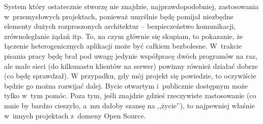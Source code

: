 System który ostatecznie stworzę nie znajdzie, najprawdopodobniej, zastosowania w~przemysłowych projektach, ponieważ umyślnie będę pomijał niezbędne elementy dużych rozproszonych architektur -- bezpieczeństwo komunikacji, zrównoleglanie żądań itp. To, na czym głównie się skupiam, to pokazanie, że łączenie heterogenicznych aplikacji może być całkiem bezbolesne. W~trakcie pisania pracy będę brał pod uwagę jedynie współpracę dwóch programów na raz, ale małe sieci (do kilkunastu klientów na serwer) powinny również działać dobrze (co będę sprawdzał). W przypadku, gdy mój projekt się powiedzie, to oczywiście będzie go można rozwijać dalej. Bycie otwartym i~publicznie dostępnym może tylko w~tym pomóc. Poza tym, jeśli znajdzie gdzieś rzeczywiste zastosowanie (co mnie by bardzo cieszyło, a~mu dałoby szansę na ,,życie''), to najpewniej właśnie w~innych projektach z~domeny Open Source.



